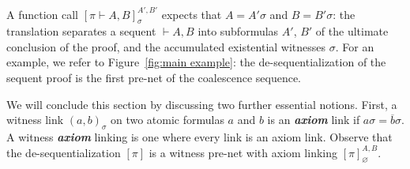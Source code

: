 \documentclass[UKenglish]{lipics-v2016}
\makeatletter
\theoremstyle{plain}
\newcommand\defn[1]{\textit{\textbf{#1}}}
\newcommand\+{+}
\renewcommand\*{\times}
\newcommand\dual[1]{\overline{#1}}
\newcommand\seq[2]{{\vdash}#1,#2}
\newcommand\prf[3]{#1\vdash\!#2,#3}
\newcommand\Seq{\vphantom(\seq}
\newcommand\Prf[3]{\deduce{\Seq{#2}{#3}}{\vphantom(#1}}
\newcommand\net[3]{#1\triangleright #2,#3}
\newcommand\deseq[4][\sigma]{[#2]_{#1}^{#3,#4}}
\newcommand\Deseq[4][\sigma]{\left[\vcenter{#2}\right]_{#1}^{#3\,,\,#4}}
\newcommand\link[3][\sigma]{(#2,#3)_{#1}}
\newcommand\Qrr{\!\!\scriptstyle\qrr}
\newcommand\qrr[1]{
  \ifx#1+\expandafter\@qrr\else
  \ifx#1*\*\mathrm R\else
  \ifx#1!\forall\mathrm R\else
  \ifx#1?\expandafter\@@qrr\else
  \ifx#11\mathrm{ax}\else
  \ifx#1.\mathrm{cut}\else
  #1\mathrm R
  \fi\fi\fi\fi\fi\fi
}
\newcommand\@qrr[1]{+\mathrm R,#1}
\newcommand\@@qrr[1]{\exists\mathrm R,#1}
\makeatother
\begin{document}


A function call $\deseq{\prf\pi AB}{A'}{B'}$ expects that $A=A'\sigma$ and $B=B'\sigma$: the translation separates a sequent $\seq AB$ into subformulas $A'$, $B'$ of the ultimate conclusion of the proof, and the accumulated existential witnesses $\sigma$.
%
For an example, we refer to Figure~\ref{fig:main example}: the de-sequentialization of the sequent proof is the first pre-net of the coalescence sequence.

We will conclude this section by discussing two further essential notions. First, a witness link $\link ab$ on two atomic formulas $a$ and $b$ is an \defn{axiom} link if $a\sigma=\dual b\sigma$. A witness \defn{axiom} linking is one where every link is an axiom link. Observe that the de-sequentialization $[\pi]$ is a witness pre-net with axiom linking $\deseq[\varnothing]\pi AB$.
\end{document}
